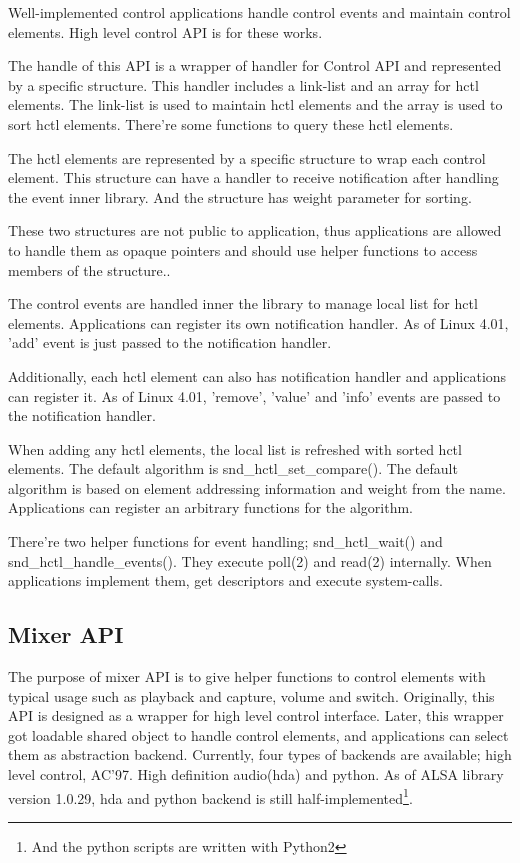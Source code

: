 \documentclass[onecolumn]{article}
\begin{document}
Well-implemented control applications handle control events and maintain control elements. High level control API is for these works.

The handle of this API is a wrapper of handler for Control API and represented by a specific structure. This handler includes a link-list and an array for hctl elements. The link-list is used to maintain hctl elements and the array is used to sort hctl elements. There're some functions to query these hctl elements.

The hctl elements are represented by a specific structure to wrap each control element. This structure can have a handler to receive notification after handling the event inner library. And the structure has weight parameter for sorting.

These two structures are not public to application, thus applications are allowed to handle them as opaque pointers and should use helper functions to access members of the structure..

The control events are handled inner the library to manage local list for hctl elements. Applications can register its own notification handler. As of Linux 4.01, 'add' event is just passed to the notification handler.

Additionally, each hctl element can also has notification handler and applications can register it. As of Linux 4.01, 'remove', 'value' and 'info' events are passed to the notification handler.

When adding any hctl elements, the local list is refreshed with sorted hctl elements. The default algorithm is snd\_hctl\_set\_compare(). The default algorithm is based on element addressing information and weight from the name. Applications can register an arbitrary functions for the algorithm.

There're two helper functions for event handling; snd\_hctl\_wait() and snd\_hctl\_handle\_events(). They execute poll(2) and read(2) internally. When applications implement them, get descriptors and execute system-calls.


\subsection{Mixer API}

The purpose of mixer API is to give helper functions to control elements with typical usage such as playback and capture, volume and switch. Originally, this API is designed as a wrapper for high level control interface. Later, this wrapper got loadable shared object to handle control elements, and applications can select them as abstraction backend. Currently, four types of backends are available; high level control, AC'97. High definition audio(hda) and python. As of ALSA library version 1.0.29, hda and python backend is still half-implemented\footnote{And the python scripts are written with Python2}.
\end{document}

